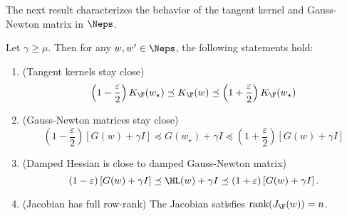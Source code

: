 The next result characterizes the behavior of the tangent kernel and Gauss-Newton matrix in $\Neps$.
\begin{lemma}
\label{lemma:local_gn}
    Let $\gamma \geq \mu$. Then for any $w,w'\in \Neps$, the following statements hold:
    \begin{enumerate}
        \item (Tangent kernels stay close) 
        \[
        \left(1-\frac{\varepsilon}{2}\right)K_\F(w_\star)\preceq K_\F(w) \preceq \left(1+\frac{\varepsilon}{2}\right) K_\F(w_\star)
        \]
        \item (Gauss-Newton matrices stay close)
        \[
         \left(1-\frac{\varepsilon}{2}\right)\left[G(w)+\gamma I\right]\preceq G(w_\star)+\gamma I \preceq \left(1+\frac{\varepsilon}{2}\right) \left[G(w)
        +\gamma I\right]\]
        \item (Damped Hessian is close to damped Gauss-Newton matrix) 
        \[
        (1-\varepsilon)\left[G(w)+\gamma I\right] \preceq \HL(w)+\gamma I \preceq (1+\varepsilon)\left[G(w)+\gamma I\right].
        \]
        \item (Jacobian has full row-rank) The Jacobian satisfies $\textup{rank}(J_{\F}(w)) = n$.
    \end{enumerate}
\end{lemma}
